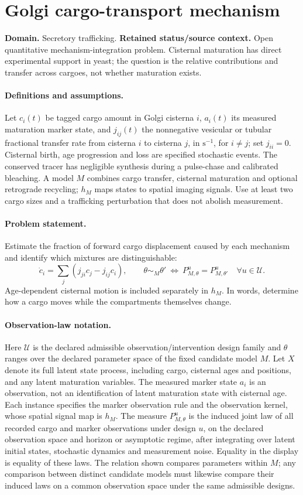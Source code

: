 \documentclass[11pt]{article}
\begin{document}
\section*{Golgi cargo-transport mechanism}
\label{prob:010}
\label{rank:211}
\par\smallskip

\noindent\textbf{Domain.} Secretory trafficking. \quad \textbf{Retained status/source context.} Open quantitative mechanism-integration problem. Cisternal maturation has direct experimental support in yeast; the question is the relative contributions and transfer across cargoes, not whether maturation exists.
\paragraph{Definitions and assumptions.} Let $c_i(t)$ be tagged cargo amount in Golgi cisterna $i$, $a_i(t)$ its measured maturation marker state, and $j_{ij}(t)$ the nonnegative vesicular or tubular fractional transfer rate from cisterna $i$ to cisterna $j$, in $\mathrm{s}^{-1}$, for $i\ne j$; set $j_{ii}=0$. Cisternal birth, age progression and loss are specified stochastic events. The conserved tracer has negligible synthesis during a pulse-chase and calibrated bleaching. A model $M$ combines cargo transfer, cisternal maturation and optional retrograde recycling; $h_M$ maps states to spatial imaging signals. Use at least two cargo sizes and a trafficking perturbation that does not abolish measurement.
\paragraph{Problem statement.} Estimate the fraction of forward cargo displacement caused by each mechanism and identify which mixtures are distinguishable:
\[
\dot c_i=\sum_j(j_{ji}c_j-j_{ij}c_i),\qquad
\theta\sim_M\theta'\ \Longleftrightarrow\ P^u_{M,\theta}=P^u_{M,\theta'}
\quad\forall u\in\mathcal U.
\]
Age-dependent cisternal motion is included separately in $h_M$. In words, determine how a cargo moves while the compartments themselves change.
\paragraph{Observation-law notation.} Here $\mathcal U$ is the declared admissible observation/intervention design family and $\theta$ ranges over the declared parameter space of the fixed candidate model $M$. Let $X$ denote its full latent state process, including cargo, cisternal ages and positions, and any latent maturation variables. The measured marker state $a_i$ is an observation, not an identification of latent maturation state with cisternal age. Each instance specifies the marker observation rule and the observation kernel, whose spatial signal map is $h_M$. The measure $P^u_{M,\theta}$ is the induced joint law of all recorded cargo and marker observations under design $u$, on the declared observation space and horizon or asymptotic regime, after integrating over latent initial states, stochastic dynamics and measurement noise. Equality in the display is equality of these laws. The relation shown compares parameters within $M$; any comparison between distinct candidate models must likewise compare their induced laws on a common observation space under the same admissible designs.
\end{document}
